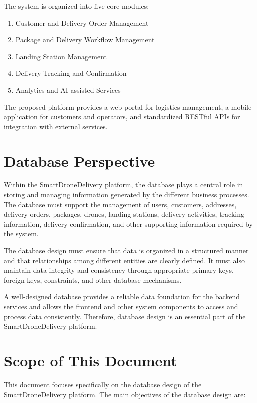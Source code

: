 The system is organized into five core modules:

\begin{enumerate}
\item Customer and Delivery Order Management
\item Package and Delivery Workflow Management
\item Landing Station Management
\item Delivery Tracking and Confirmation
\item Analytics and AI-assisted Services
\end{enumerate}

The proposed platform provides a web portal for logistics management, a mobile application for customers and operators, and standardized RESTful APIs for integration with external services.
\section{Database Perspective} 

\qquad Within the SmartDroneDelivery platform, the database plays a central role in storing and managing information generated by the different business processes. The database must support the management of users, customers, addresses, delivery orders, packages, drones, landing stations, delivery activities, tracking information, delivery confirmation, and other supporting information required by the system.

The database design must ensure that data is organized in a structured manner and that relationships among different entities are clearly defined. It must also maintain data integrity and consistency through appropriate primary keys, foreign keys, constraints, and other database mechanisms.

A well-designed database provides a reliable data foundation for the backend services and allows the frontend and other system components to access and process data consistently. Therefore, database design is an essential part of the SmartDroneDelivery platform.
\section{Scope of This Document} 

This document focuses specifically on the database design of the SmartDroneDelivery platform.
The main objectives of the database design are:

